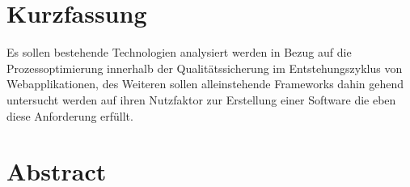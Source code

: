 \section*{Kurzfassung}
Es sollen bestehende Technologien analysiert werden in Bezug auf die Prozessoptimierung innerhalb der Qualitätssicherung im Entstehungszyklus von Webapplikationen, des Weiteren sollen alleinstehende Frameworks dahin gehend untersucht werden auf ihren Nutzfaktor zur Erstellung einer Software die eben diese Anforderung erfüllt.

\section*{Abstract}
